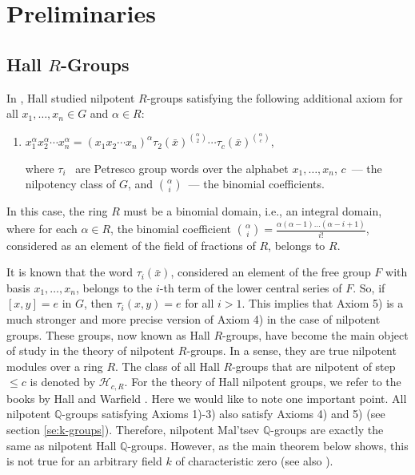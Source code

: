 \documentclass[11pt]{article}
\def\Q{{\mathbb Q}}
\theoremstyle{definition}
\begin{document}
\section{Preliminaries}

\subsection{Hall \texorpdfstring{$R$}{}-Groups}
\label{se:2.1}


In \cite{12}, Hall studied nilpotent $R$-groups satisfying the following additional axiom for all $x_1, \ldots,x_n \in G$ and $\alpha \in R$:
\begin{enumerate}
\item [5)] $x_1^\alpha x_2^\alpha\cdots x_n^\alpha=(x_1x_2\cdots x_n)^\alpha\tau_2(\bar{x})^{\binom{\alpha}{2}}\cdots \tau_c(\bar{x})^{\binom{\alpha}{c}}$,

where $\tau_i$~ are Petresco group words over the alphabet $x_1, \ldots,x_n$, $c$~--- the nilpotency class of $G$, and ${\binom{\alpha}{i}}$~--- the binomial coefficients.
\end{enumerate}
In this case, the ring $R$ must be a binomial domain, i.e., an integral domain, where for each $\alpha \in R$, the binomial coefficient
${\binom{\alpha}{i}} = \frac{\alpha(\alpha-1)\ldots (\alpha-i+1)}{i!}$, considered as an element of the field of fractions of $R$, belongs to $R$.

It is known that the word $\tau_i(\bar x)$, considered an element of the free group $F$ with basis $x_1, \ldots,x_n$, belongs to the $i$-th term of the lower central series of $F$. So, if $[x,y] =e$ in $G$, then $\tau_i(x,y) = e$ for all $i > 1$. This implies that   Axiom 5) is a much stronger and more precise version of Axiom 4) in the case of nilpotent groups. These groups, now known as Hall $R$-groups, have become the main object of study in the theory of nilpotent $R$-groups. In a sense, they are true nilpotent modules over a ring $R$. The class of all Hall $R$-groups that are nilpotent of step $\leq c$ is denoted by $\mathcal H_{c,R}$. For the theory of Hall nilpotent groups, we refer to the books by Hall \cite{12} and Warfield \cite{W}. Here we would like to note one important point. All nilpotent $\Q$-groups satisfying Axioms 1)-3) also satisfy Axioms 4) and 5) (see section \ref{se:k-groups}). Therefore, nilpotent Mal'tsev $\Q$-groups are exactly the same as nilpotent Hall $\Q$-groups. However, as the main theorem below shows, this is not true for an arbitrary field $k$ of characteristic zero (see also \cite{3, 9}).
\end{document}
